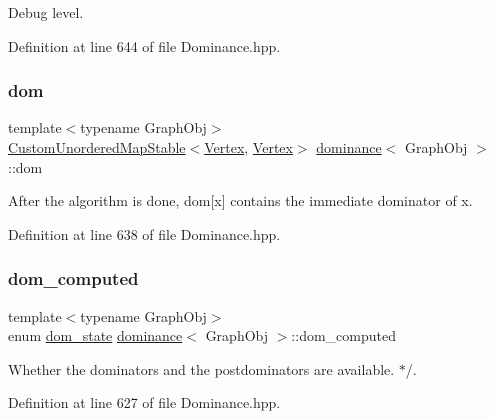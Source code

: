 Debug level. 



Definition at line 644 of file Dominance.\+hpp.

\mbox{\label{classdominance_a703762a55e6857d60e37ea71790b84dd}} 
\subsubsection{\texorpdfstring{dom}{dom}}
{\footnotesize\ttfamily template$<$typename Graph\+Obj$>$ \\
\hyperlink{custom__map_8hpp_a7314a7df1cdb3a3acf478ab86e95c226}{Custom\+Unordered\+Map\+Stable}$<$\hyperlink{classdominance_acc73faf26e73171b15fd0ff6c63ca393}{Vertex}, \hyperlink{classdominance_acc73faf26e73171b15fd0ff6c63ca393}{Vertex}$>$ \hyperlink{classdominance}{dominance}$<$ Graph\+Obj $>$\+::dom\hspace{0.3cm}{\ttfamily [private]}}



After the algorithm is done, dom\mbox{[}x\mbox{]} contains the immediate dominator of x. 



Definition at line 638 of file Dominance.\+hpp.

\mbox{\label{classdominance_aed13361be369ca9b539641979e2e8dff}} 
\subsubsection{\texorpdfstring{dom\+\_\+computed}{dom\_computed}}
{\footnotesize\ttfamily template$<$typename Graph\+Obj$>$ \\
enum \hyperlink{classdominance_a0c204e06a7b2ea3dc3594722523ab47e}{dom\+\_\+state} \hyperlink{classdominance}{dominance}$<$ Graph\+Obj $>$\+::dom\+\_\+computed\hspace{0.3cm}{\ttfamily [private]}}



Whether the dominators and the postdominators are available. $\ast$/. 



Definition at line 627 of file Dominance.\+hpp.

\mbox{\label{classdominance_a9d1cc666f009059229e10b8cf599ae9c}} 
